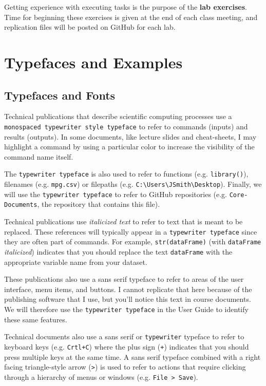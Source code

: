 \documentclass[]{book}
\theoremstyle{definition}
\theoremstyle{definition}
\theoremstyle{definition}
\theoremstyle{remark}
\begin{document}
Getting experience with executing tasks is the purpose of the
\textbf{lab exercises}. Time for beginning these exercises is given at
the end of each class meeting, and replication files will be posted on
GitHub for each lab.

\section{Typefaces and Examples}\label{typefaces-and-examples}

\subsection{Typefaces and Fonts}\label{typefaces-and-fonts}

Technical publications that describe scientific computing processes use
a \texttt{monospaced\ typewriter\ style\ typeface} to refer to commands
(inputs) and results (outputs). In some documents, like lecture slides
and cheat-sheets, I may highlight a command by using a particular color
to increase the visibility of the command name itself.

The \texttt{typewriter\ typeface} is also used to refer to functions
(e.g. \texttt{library()}), filenames (e.g. \texttt{mpg.csv}) or
filepaths (e.g.
\texttt{C:\textbackslash{}Users\textbackslash{}JSmith\textbackslash{}Desktop}).
Finally, we will use the \texttt{typewriter\ typeface} to refer to
GitHub repositories (e.g. \texttt{Core-Documents}, the repository that
contains this file).

Technical publications use \emph{italicized text} to refer to text that
is meant to be replaced. These references will typically appear in a
\texttt{typewriter\ typeface} since they are often part of commands. For
example, \texttt{str(dataFrame)} (with \texttt{dataFrame}
\emph{italicized}) indicates that you should replace the text
\texttt{dataFrame} with the appropriate variable name from your dataset.

These publications also use a sans serif typeface to refer to areas of
the user interface, menu items, and buttons. I cannot replicate that
here because of the publishing software that I use, but you'll notice
this text in course documents. We will therefore use the
\texttt{typewriter\ typeface} in the User Guide to identify these same
features.

Technical documents also use a sans serif or \texttt{typewriter}
typeface to refer to keyboard keys (e.g. \texttt{Crtl+C}) where the plus
sign (\texttt{+}) indicates that you should press multiple keys at the
same time. A sans serif typeface combined with a right facing
triangle-style arrow (\texttt{\textgreater{}}) is used to refer to
actions that require clicking through a hierarchy of menus or windows
(e.g. \texttt{File\ \textgreater{}\ Save}).
\end{document}
